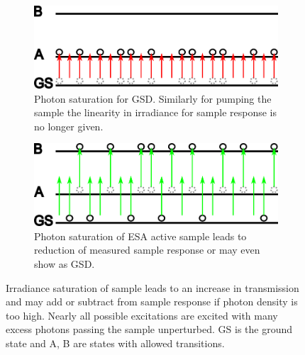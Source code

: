 \documentclass[twoside,openright]{scrreprt}
\begin{document}
{\begin{figure}[hbtp]
\centering
\begin{subfigure}[b]{0.5\linewidth}
\centering
\includegraphics[scale=1]{images/TA_saturation_GSD.png}
\caption{Photon saturation for GSD. Similarly for pumping the sample the linearity in irradiance for sample response is no longer given.}
\end{subfigure}\hfill
\begin{subfigure}[b]{0.5\linewidth}
\centering
\includegraphics[scale=1]{images/TA_saturation_ESA.png}
\caption{Photon saturation of ESA active sample leads to reduction of measured sample response or may even show as GSD.}
\end{subfigure}
\caption{Irradiance saturation of sample leads to an increase in transmission and may add or subtract from sample response if photon density is too high. Nearly all possible excitations are excited with many excess photons passing the sample unperturbed.  GS is the ground state and A, B are states with allowed transitions.}
\end{figure}

}
\end{document}
